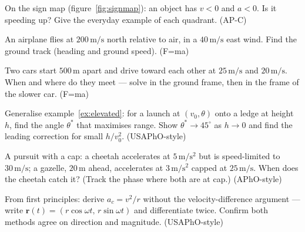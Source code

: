 \begin{exercise}[medium]
On the sign map (figure~\ref{fig:signmap}): an object has $v<0$ and $a<0$.
Is it speeding up? Give the everyday example of each quadrant.
(AP-C)
\end{exercise}
\begin{exercise}[medium]
An airplane flies at $200\,\mathrm{m/s}$ north relative to air, in a
$40\,\mathrm{m/s}$ east wind. Find the ground track (heading and ground
speed). (F=ma)
\end{exercise}
\begin{exercise}[medium]
Two cars start $500\,\mathrm{m}$ apart and drive toward each other at
$25\,\mathrm{m/s}$ and $20\,\mathrm{m/s}$. When and where do they meet ---
solve in the ground frame, then in the frame of the slower car. (F=ma)
\end{exercise}
\begin{exercise}[hard]
Generalise example~\ref{ex:elevated}: for a launch at $(v_0,\theta)$ onto a
ledge at height $h$, find the angle $\theta^{*}$ that maximises range. Show
$\theta^{*}\to45^{\circ}$ as $h\to0$ and find the leading correction for
small $h/v_0^{2}$. (USAPhO-style)
\end{exercise}
\begin{exercise}[hard]
A pursuit with a cap: a cheetah accelerates at $5\,\mathrm{m/s^{2}}$ but is
speed-limited to $30\,\mathrm{m/s}$; a gazelle, $20\,\mathrm{m}$ ahead,
accelerates at $3\,\mathrm{m/s^{2}}$ capped at $25\,\mathrm{m/s}$. When does
the cheetah catch it? (Track the phase where both are at cap.) (APhO-style)
\end{exercise}
\begin{exercise}[hard]
From first principles: derive $a_c=v^{2}/r$ without the velocity-difference
argument --- write $\mathbf r(t)=(r\cos\omega t,\,r\sin\omega t)$ and
differentiate twice. Confirm both methods agree on direction and magnitude.
(USAPhO-style)
\end{exercise}
